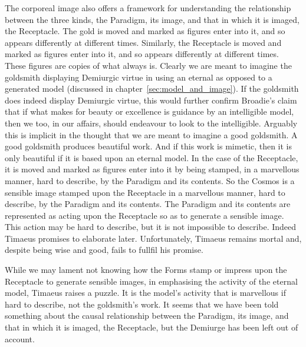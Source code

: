 The corporeal image also offers a framework for understanding the relationship between the three kinds, the Paradigm, its image, and that in which it is imaged, the Receptacle. The gold is moved and marked as figures enter into it, and so appears differently at different times. Similarly, the Receptacle is moved and marked as figures enter into it, and so appears differently at different times. These figures are copies of what always is. Clearly we are meant to imagine the goldsmith displaying Demiurgic virtue in using an eternal as opposed to a generated model (discussed in chapter~\ref{sec:model_and_image}). If the goldsmith does indeed display Demiurgic virtue, this would further confirm Broadie's \citeyearpar[28--9]{Broadie:2012vl} claim that if what makes for beauty or excellence is guidance by an intelligible model, then we too, in our affairs, should endeavour to look to the intelligible. Arguably this is implicit in the thought that we are meant to imagine a good goldsmith. A good goldsmith produces beautiful work. And if this work is mimetic, then it is only beautiful if it is based upon an eternal model. In the case of the Receptacle, it is moved and marked as figures enter into it by being stamped, in a marvellous manner, hard to describe, by the Paradigm and its contents. So the Cosmos is a sensible image stamped upon the Receptacle in a marvellous manner, hard to describe, by the Paradigm and its contents. The Paradigm and its contents are represented as acting upon the Receptacle so as to generate a sensible image. This action may be hard to describe, but it is not impossible to describe. Indeed Timaeus promises to elaborate later. Unfortunately, Timaeus remains mortal and, despite being wise and good, fails to fullfil his promise.

While we may lament not knowing how the Forms stamp or impress upon the Receptacle to generate sensible images, in emphasising the activity of the eternal model, Timaeus raises a puzzle. It is the model's activity that is marvellous if hard to describe, not the goldsmith's work. It seems that we have been told something about the causal relationship between the Paradigm, its image, and that in which it is imaged, the Receptacle, but the Demiurge has been left out of account.


